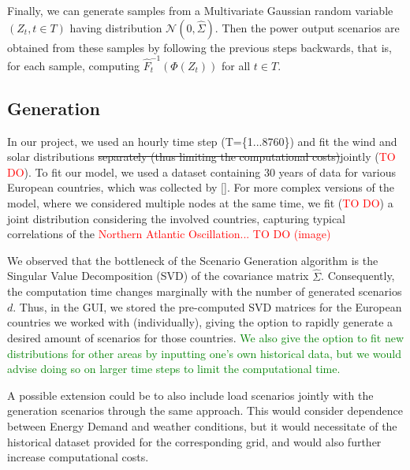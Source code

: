 \documentclass[english]{article}
\numberwithin{definition}{section}
\numberwithin{theorem}{section}
\numberwithin{problem}{section}
\begin{document}
Finally, we can generate samples from a Multivariate Gaussian random variable \((Z_{t}, t \in T)\) having distribution \(\mathcal{N}(0, \hat \Sigma)\).  Then the power output scenarios are obtained from these samples by following the previous steps backwards, that is, for each sample, computing \(\hat F_{t}^{-1}(\Phi(Z_{t}))\) for all \(t\in T\). \\

\subsection{Generation}
In our project, we used an hourly time step (T=\{1...8760\}) and fit the wind and solar distributions \st{separately (thus limiting the computational costs)}jointly (\textcolor{red}{TO DO}). To fit our model, we used a dataset containing 30 years of data for various European countries, which was collected by [\cite{PVDataSet}]. 
For more complex versions of the model, where we considered multiple nodes at the same time, we fit (\textcolor{red}{TO DO}) a joint distribution considering the involved countries, capturing typical correlations of the \textcolor{red}{Northern Atlantic Oscillation... TO DO (image)} 

We observed that the bottleneck of the Scenario Generation algorithm is the Singular Value Decomposition (SVD) of the covariance matrix \(\hat{\Sigma}\). Consequently, the computation time changes marginally with the number of generated scenarios \(d\). Thus, in the GUI, we stored the pre-computed SVD matrices for the European countries we worked with (individually), giving the option to rapidly generate a desired amount of scenarios for those countries. \textcolor{green}{We also give the option to fit new distributions for other areas by inputting one's own historical data, but we would advise doing so on larger time steps to limit the computational time. }

A possible extension could be to also include load scenarios jointly with the generation scenarios through the same approach. This would consider dependence between Energy Demand and weather conditions, but it would necessitate of the historical dataset provided for the corresponding grid, and would also further increase computational costs.
\end{document}
